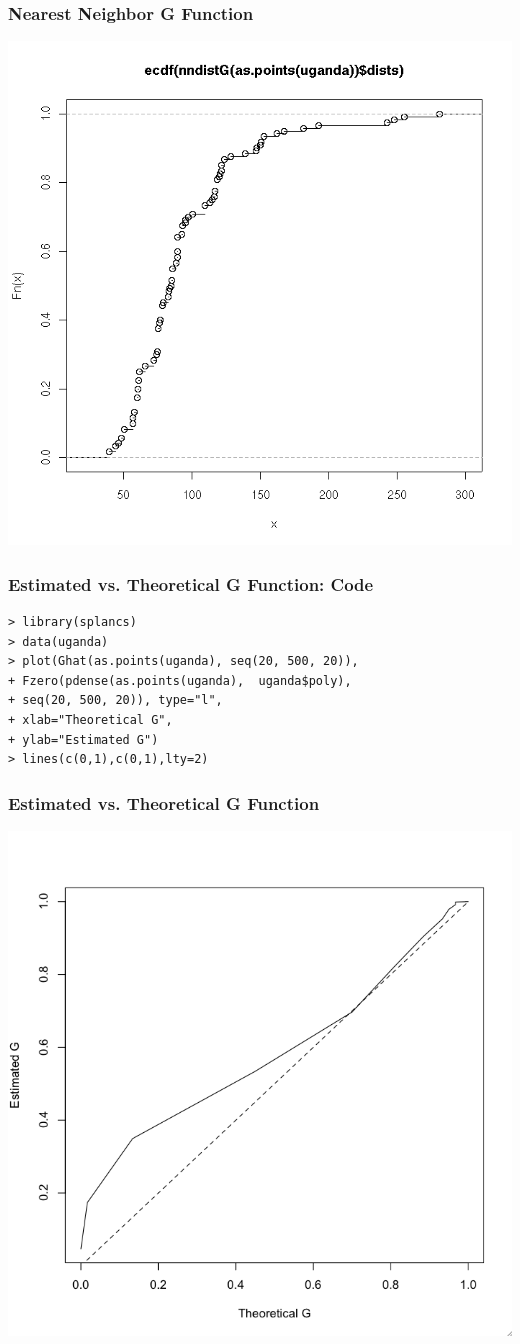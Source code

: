 \documentclass[nototal,handout]{beamer}
\begin{document}
\begin{frame}[<+->]
    \frametitle{Nearest Neighbor G Function}
    \begin{center}
      \includegraphics[width=.65\linewidth]{nng.png}
    \end{center}
  \end{frame}


  \begin{frame}[containsverbatim]
    \frametitle{Estimated vs. Theoretical G Function: Code}
    \begin{small}
      \begin{verbatim}
> library(splancs)
> data(uganda)
> plot(Ghat(as.points(uganda), seq(20, 500, 20)),
+ Fzero(pdense(as.points(uganda),  uganda$poly),
+ seq(20, 500, 20)), type="l", 
+ xlab="Theoretical G", 
+ ylab="Estimated G")
> lines(c(0,1),c(0,1),lty=2)
      \end{verbatim}
    \end{small}
   \end{frame}


\begin{frame}[<+->]
    \frametitle{Estimated vs. Theoretical G Function}
    \begin{center}
      \includegraphics[width=.65\linewidth]{theoryg.png}
    \end{center}
  \end{frame}
\end{document}
